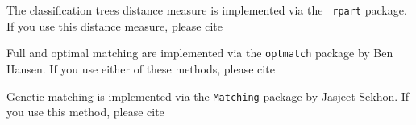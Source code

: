The classification trees distance measure is implemented via the {\tt
  rpart} package.  If you use this distance measure, please cite
\begin{verse}
\end{verse}  

Full and optimal matching are implemented via the {\tt optmatch}
package by Ben Hansen. If you use either of these methods, please cite
\begin{verse}
\end{verse} 

Genetic matching is implemented via the {\tt Matching} package by
Jasjeet Sekhon.  If you use this method, please cite
\begin{verse}
\end{verse}

